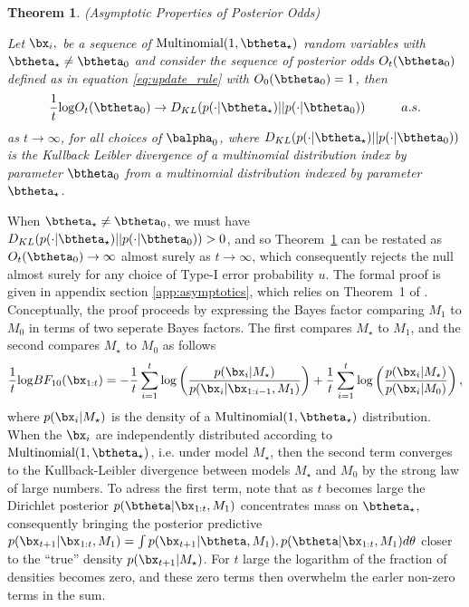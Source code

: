 \documentclass[11pt]{article}
\def\log{{\rm log}}
\newtheorem{thm}{Theorem}[section]
\begin{document}
\begin{thm}(Asymptotic Properties of Posterior Odds)
  
  \label{thm:consistency}
\noindent Let $\bx_i,$ be a sequence of $\text{Multinomial}(1,\btheta_{\star})$ random variables with $\btheta_{\star} \neq \btheta_0$ and consider the sequence of posterior odds $O_t(\btheta_0)$ defined as in equation \eqref{eq:update_rule} with $O_0(\btheta_0)=1$, then
\begin{equation}
  \label{eq:consistency}
  \frac{1}{t} \log O_t(\btheta_0) \rightarrow D_{KL}(p(\cdot|\btheta_{\star}) || p(\cdot|\btheta_0)) \hspace{1cm} a.s.
\end{equation}
as $t \rightarrow \infty$, for all choices of $\balpha_0$, where $D_{KL}(p(\cdot|\btheta_{\star}) || p(\cdot|\btheta_0))$ is the Kullback Leibler divergence of a multinomial distribution index by parameter $\btheta_0$ from a multinomial distribution indexed by parameter $\btheta_{\star}$.

\end{thm}
\noindent When $\btheta_{\star} \neq \btheta_0$, we must have $D_{KL}(p(\cdot|\btheta_{\star}) || p(\cdot|\btheta_0)) > 0$, and so Theorem~\ref{thm:consistency} can be restated as $O_t(\btheta_0) \rightarrow \infty$ almost surely as $t \rightarrow \infty$, which consequently rejects the null almost surely for any choice of Type-I error probability $u$.
The formal proof is given in appendix section \ref{app:asymptotics}, which relies on Theorem~1 of \cite{walker}.
Conceptually, the proof proceeds by expressing the Bayes factor comparing $M_1$ to $M_0$ in terms of two seperate Bayes factors.
The first compares $M_{\star}$ to $M_1$, and the second compares $M_{\star}$ to $M_0$ as follows
\begin{align*}
 \frac{1}{t} \log BF_{10}(\bx_{1:t}) = - \frac{1}{t}\sum_{i=1}^{t}\log \left( \frac{p(\bx_{i}|M_\star)}{p(\bx_{i}|\bx_{1:i-1},M_1)}\right) + \frac{1}{t}\sum_{i=1}^{t} \log  \left( \frac{p(\bx_{i}|M_\star)}{p(\bx_{i}|M_0)}\right),\\
\end{align*}
where  $p(\bx_i|M_\star)$ is the density of a $\text{Multinomial}(1,\btheta_{\star})$ distribution.
When the $\bx_i$ are independently distributed according to $\text{Multinomial}(1, \btheta_\star)$, i.e.
under model $M_\star$, then the second term converges to the Kullback-Leibler divergence between models $M_\star$ and $M_0$ by the strong law of large numbers.
To adress the first term, note that as $t$ becomes large the Dirichlet posterior $p(\btheta|\bx_{1:t}, M_1)$ concentrates mass on $\btheta_\star$, consequently bringing the posterior predictive $p(\bx_{t+1}|\bx_{1:t},M_1) =\int p(\bx_{t+1}|\btheta,M_1),p(\btheta|\bx_{1:t},M_1) d\theta$ closer to the ``true'' density $p(\bx_{t+1}|M_{\star})$.
For $t$ large the logarithm of the fraction of densities becomes zero, and these zero terms then overwhelm the earler non-zero terms in the sum.
\end{document}
